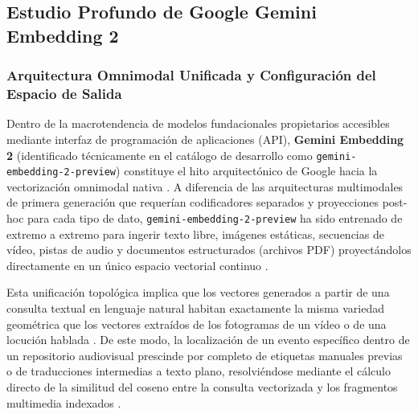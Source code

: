 
\subsection{Estudio Profundo de Google Gemini Embedding 2}
\label{subsec:gemini_embedding_2}

\subsubsection{Arquitectura Omnimodal Unificada y Configuración del Espacio de Salida}
\label{subsubsec:arquitectura_gemini_embedding_2}

Dentro de la macrotendencia de modelos fundacionales propietarios accesibles mediante interfaz de programación de aplicaciones (API), \textbf{Gemini Embedding 2} (identificado técnicamente en el catálogo de desarrollo como \texttt{gemini-embedding-2-preview}) constituye el hito arquitectónico de Google hacia la vectorización omnimodal nativa \cite{gemini_emb2_docs, gemini_embeddings_general_docs}. %
A diferencia de las arquitecturas multimodales de primera generación que requerían codificadores separados y proyecciones post-hoc para cada tipo de dato, \texttt{gemini-embedding-2-preview} ha sido entrenado de extremo a extremo para ingerir texto libre, imágenes estáticas, secuencias de vídeo, pistas de audio y documentos estructurados (archivos PDF) proyectándolos directamente en un único espacio vectorial continuo \cite{gemini_emb2_docs, openrouter_gemini_emb2}. %

Esta unificación topológica implica que los vectores generados a partir de una consulta textual en lenguaje natural habitan exactamente la misma variedad geométrica que los vectores extraídos de los fotogramas de un vídeo o de una locución hablada \cite{gemini_emb2_docs}. %
De este modo, la localización de un evento específico dentro de un repositorio audiovisual prescinde por completo de etiquetas manuales previas o de traducciones intermedias a texto plano, resolviéndose mediante el cálculo directo de la similitud del coseno entre la consulta vectorizada y los fragmentos multimedia indexados \cite{gemini_emb2_docs}. %

